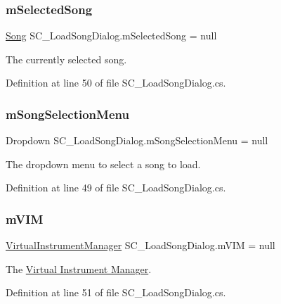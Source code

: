 \mbox{\label{group___s_c___l_s_d_priv_var_ga007db4c9493497f21fb518ab676226a4}} 
\subsubsection{\texorpdfstring{m\+Selected\+Song}{mSelectedSong}}
{\footnotesize\ttfamily \hyperlink{class_song}{Song} S\+C\+\_\+\+Load\+Song\+Dialog.\+m\+Selected\+Song = null\hspace{0.3cm}{\ttfamily [private]}}



The currently selected song. 



Definition at line 50 of file S\+C\+\_\+\+Load\+Song\+Dialog.\+cs.

\mbox{\label{group___s_c___l_s_d_priv_var_ga93543d4b5bf0c2127cb5489112cc29be}} 
\subsubsection{\texorpdfstring{m\+Song\+Selection\+Menu}{mSongSelectionMenu}}
{\footnotesize\ttfamily Dropdown S\+C\+\_\+\+Load\+Song\+Dialog.\+m\+Song\+Selection\+Menu = null\hspace{0.3cm}{\ttfamily [private]}}



The dropdown menu to select a song to load. 



Definition at line 49 of file S\+C\+\_\+\+Load\+Song\+Dialog.\+cs.

\mbox{\label{group___s_c___l_s_d_priv_var_ga6ffbaa999c431dd52e57c242b1b33b49}} 
\subsubsection{\texorpdfstring{m\+V\+IM}{mVIM}}
{\footnotesize\ttfamily \hyperlink{class_virtual_instrument_manager}{Virtual\+Instrument\+Manager} S\+C\+\_\+\+Load\+Song\+Dialog.\+m\+V\+IM = null\hspace{0.3cm}{\ttfamily [private]}}



The \hyperlink{group___v_i_m}{Virtual Instrument Manager}. 



Definition at line 51 of file S\+C\+\_\+\+Load\+Song\+Dialog.\+cs.

